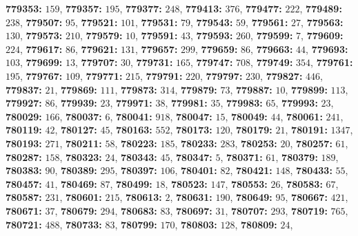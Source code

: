 \textsf{\bfseries 779353:} $159$, \textsf{\bfseries 779357:} $195$, \textsf{\bfseries 779377:} $248$, \textsf{\bfseries 779413:} $376$, \textsf{\bfseries 779477:} $222$, \textsf{\bfseries 779489:} $238$, \textsf{\bfseries 779507:} $95$, \textsf{\bfseries 779521:} $101$, \textsf{\bfseries 779531:} $79$, \textsf{\bfseries 779543:} $59$, \textsf{\bfseries 779561:} $27$, \textsf{\bfseries 779563:} $130$, \textsf{\bfseries 779573:} $210$, \textsf{\bfseries 779579:} $10$, \textsf{\bfseries 779591:} $43$, \textsf{\bfseries 779593:} $260$, \textsf{\bfseries 779599:} $7$, \textsf{\bfseries 779609:} $224$, \textsf{\bfseries 779617:} $86$, \textsf{\bfseries 779621:} $131$, \textsf{\bfseries 779657:} $299$, \textsf{\bfseries 779659:} $86$, \textsf{\bfseries 779663:} $44$, \textsf{\bfseries 779693:} $103$, \textsf{\bfseries 779699:} $13$, \textsf{\bfseries 779707:} $30$, \textsf{\bfseries 779731:} $165$, \textsf{\bfseries 779747:} $708$, \textsf{\bfseries 779749:} $354$, \textsf{\bfseries 779761:} $195$, \textsf{\bfseries 779767:} $109$, \textsf{\bfseries 779771:} $215$, \textsf{\bfseries 779791:} $220$, \textsf{\bfseries 779797:} $230$, \textsf{\bfseries 779827:} $446$, \textsf{\bfseries 779837:} $21$, \textsf{\bfseries 779869:} $111$, \textsf{\bfseries 779873:} $314$, \textsf{\bfseries 779879:} $73$, \textsf{\bfseries 779887:} $10$, \textsf{\bfseries 779899:} $113$, \textsf{\bfseries 779927:} $86$, \textsf{\bfseries 779939:} $23$, \textsf{\bfseries 779971:} $38$, \textsf{\bfseries 779981:} $35$, \textsf{\bfseries 779983:} $65$, \textsf{\bfseries 779993:} $23$, \textsf{\bfseries 780029:} $166$, \textsf{\bfseries 780037:} $6$, \textsf{\bfseries 780041:} $918$, \textsf{\bfseries 780047:} $15$, \textsf{\bfseries 780049:} $44$, \textsf{\bfseries 780061:} $241$, \textsf{\bfseries 780119:} $42$, \textsf{\bfseries 780127:} $45$, \textsf{\bfseries 780163:} $552$, \textsf{\bfseries 780173:} $120$, \textsf{\bfseries 780179:} $21$, \textsf{\bfseries 780191:} $1347$, \textsf{\bfseries 780193:} $271$, \textsf{\bfseries 780211:} $58$, \textsf{\bfseries 780223:} $185$, \textsf{\bfseries 780233:} $283$, \textsf{\bfseries 780253:} $20$, \textsf{\bfseries 780257:} $61$, \textsf{\bfseries 780287:} $158$, \textsf{\bfseries 780323:} $24$, \textsf{\bfseries 780343:} $45$, \textsf{\bfseries 780347:} $5$, \textsf{\bfseries 780371:} $61$, \textsf{\bfseries 780379:} $189$, \textsf{\bfseries 780383:} $90$, \textsf{\bfseries 780389:} $295$, \textsf{\bfseries 780397:} $106$, \textsf{\bfseries 780401:} $82$, \textsf{\bfseries 780421:} $148$, \textsf{\bfseries 780433:} $55$, \textsf{\bfseries 780457:} $41$, \textsf{\bfseries 780469:} $87$, \textsf{\bfseries 780499:} $18$, \textsf{\bfseries 780523:} $147$, \textsf{\bfseries 780553:} $26$, \textsf{\bfseries 780583:} $67$, \textsf{\bfseries 780587:} $231$, \textsf{\bfseries 780601:} $215$, \textsf{\bfseries 780613:} $2$, \textsf{\bfseries 780631:} $190$, \textsf{\bfseries 780649:} $95$, \textsf{\bfseries 780667:} $421$, \textsf{\bfseries 780671:} $37$, \textsf{\bfseries 780679:} $294$, \textsf{\bfseries 780683:} $83$, \textsf{\bfseries 780697:} $31$, \textsf{\bfseries 780707:} $293$, \textsf{\bfseries 780719:} $765$, \textsf{\bfseries 780721:} $488$, \textsf{\bfseries 780733:} $83$, \textsf{\bfseries 780799:} $170$, \textsf{\bfseries 780803:} $128$, \textsf{\bfseries 780809:} $24$, 

